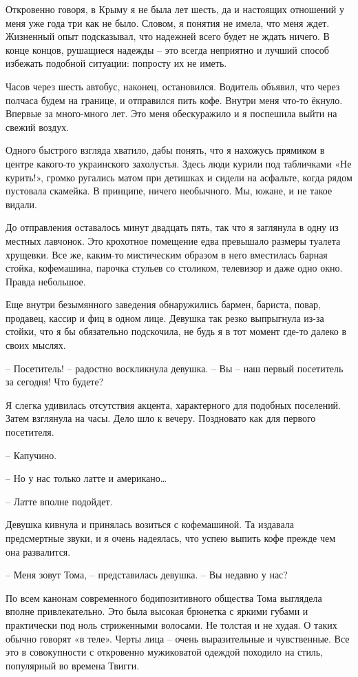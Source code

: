 \documentclass[
]{book}
\begin{document}
Откровенно говоря, в Крыму я не была лет шесть, да и настоящих отношений у меня уже года три как не было. Словом, я понятия не имела, что меня ждет. Жизненный опыт подсказывал, что надежней всего будет не ждать ничего. В конце концов, рушащиеся надежды -- это всегда неприятно и лучший способ избежать подобной ситуации: попросту их не иметь.

Часов через шесть автобус, наконец, остановился. Водитель объявил, что через полчаса будем на границе, и отправился пить кофе. Внутри меня что-то ёкнуло. Впервые за много-много лет. Это меня обескуражило и я поспешила выйти на свежий воздух.

Одного быстрого взгляда хватило, дабы понять, что я нахожусь прямиком в центре какого-то украинского захолустья. Здесь люди курили под табличками «Не курить!», громко ругались матом при детишках и сидели на асфальте, когда рядом пустовала скамейка. В принципе, ничего необычного. Мы, южане, и не такое видали.

До отправления оставалось минут двадцать пять, так что я заглянула в одну из местных лавчонок. Это крохотное помещение едва превышало размеры туалета хрущевки. Все же, каким-то мистическим образом в него вместилась барная стойка, кофемашина, парочка стульев со столиком, телевизор и даже одно окно. Правда небольшое.

Еще внутри безымянного заведения обнаружились бармен, бариста, повар, продавец, кассир и фиц в одном лице. Девушка так резко выпрыгнула из-за стойки, что я бы обязательно подскочила, не будь я в тот момент где-то далеко в своих мыслях.

-- Посетитель! -- радостно воскликнула девушка. -- Вы -- наш первый посетитель за сегодня! Что будете?

Я слегка удивилась отсутствия акцента, характерного для подобных поселений. Затем взглянула на часы. Дело шло к вечеру. Поздновато как для первого посетителя.

-- Капучино.

-- Но у нас только латте и американо\ldots{}

-- Латте вполне подойдет.

Девушка кивнула и принялась возиться с кофемашиной. Та издавала предсмертные звуки, и я очень надеялась, что успею выпить кофе прежде чем она развалится.

-- Меня зовут Тома, -- представилась девушка. -- Вы недавно у нас?

По всем канонам современного бодипозитивного общества Тома выглядела вполне привлекательно. Это была высокая брюнетка с яркими губами и практически под ноль стриженными волосами. Не толстая и не худая. О таких обычно говорят «в теле». Черты лица -- очень выразительные и чувственные. Все это в совокупности с откровенно мужиковатой одеждой походило на стиль, популярный во времена Твигги.
\end{document}
